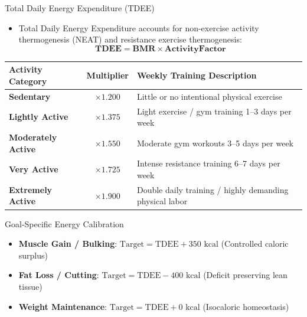 \documentclass[aspectratio=169,10pt]{beamer}
\begin{document}
\begin{frame}{Total Daily Energy Expenditure (TDEE)}
  \begin{itemize}
    \item Total Daily Energy Expenditure accounts for non-exercise activity thermogenesis (NEAT) and resistance exercise thermogenesis:
    \[
      \mathbf{TDEE = BMR \times ActivityFactor}
    \]
  \end{itemize}
  \begin{table}[h]
    \centering
    \small
    \begin{tabular}{lcl}
      \toprule
      \textbf{Activity Category} & \textbf{Multiplier} & \textbf{Weekly Training Description} \\
      \midrule
      \textbf{Sedentary} & $\times 1.200$ & Little or no intentional physical exercise \\
      \textbf{Lightly Active} & $\times 1.375$ & Light exercise / gym training 1--3 days per week \\
      \textbf{Moderately Active} & $\mathbf{\times 1.550}$ & Moderate gym workouts 3--5 days per week \\
      \textbf{Very Active} & $\times 1.725$ & Intense resistance training 6--7 days per week \\
      \textbf{Extremely Active} & $\times 1.900$ & Double daily training / highly demanding physical labor \\
      \bottomrule
    \end{tabular}
  \end{table}
  \begin{block}{Goal-Specific Energy Calibration}
    \begin{itemize}
      \item \textbf{Muscle Gain / Bulking}: $\text{Target} = \text{TDEE} + 350\text{ kcal}$ (Controlled caloric surplus)
      \item \textbf{Fat Loss / Cutting}: $\text{Target} = \text{TDEE} - 400\text{ kcal}$ (Deficit preserving lean tissue)
      \item \textbf{Weight Maintenance}: $\text{Target} = \text{TDEE} + 0\text{ kcal}$ (Isocaloric homeostasis)
    \end{itemize}
  \end{block}
\end{frame}
\end{document}
